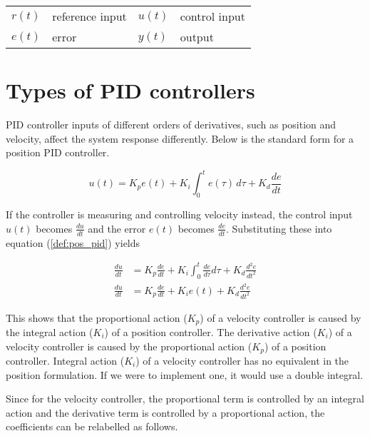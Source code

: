 \begin{figurekey}
  \begin{tabulary}{\linewidth}{LLLL}
    $r(t)$ & \gls{reference} input & $u(t)$ & control input \\
    $e(t)$ & error & $y(t)$ & \gls{output} \\
  \end{tabulary}
\end{figurekey}

\section{Types of PID controllers}

PID controller inputs of different orders of derivatives, such as position and
velocity, affect the \gls{system} response differently. Below is the standard
form for a position PID controller.

\begin{definition}
  \begin{equation}
    u(t) = K_p e(t) + K_i \int_0^t e(\tau) \,d\tau + K_d \frac{de}{dt}
    \label{def:pos_pid}
  \end{equation}
\end{definition}

If the controller is measuring and controlling velocity instead, the control
input $u(t)$ becomes $\frac{du}{dt}$ and the error $e(t)$ becomes
$\frac{de}{dt}$. Substituting these into equation (\ref{def:pos_pid}) yields

\begin{align}
  \frac{du}{dt} &= K_p \frac{de}{dt} + K_i \int_0^t \frac{de}{d\tau} d\tau +
    K_d \frac{d^2e}{dt^2} \nonumber \\
  \frac{du}{dt} &= K_p \frac{de}{dt} + K_i e(t) + K_d \frac{d^2e}{dt^2}
\end{align}

This shows that the proportional action ($K_p$) of a velocity controller is
caused by the integral action ($K_i$) of a position controller. The derivative
action ($K_i$) of a velocity controller is caused by the proportional action
($K_p$) of a position controller. Integral action ($K_i$) of a velocity
controller has no equivalent in the position formulation. If we were to
implement one, it would use a double integral.

Since for the velocity controller, the proportional term is controlled by an
integral action and the derivative term is controlled by a proportional action,
the coefficients can be relabelled as follows.

